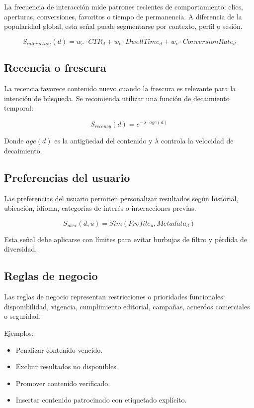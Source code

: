 \documentclass[12pt,a4paper]{article}
\begin{document}
La frecuencia de interacción mide patrones recientes de comportamiento: clics, aperturas, conversiones, favoritos o tiempo de permanencia. A diferencia de la popularidad global, esta señal puede segmentarse por contexto, perfil o sesión.

\[
S_{interaction}(d) = w_c \cdot CTR_d + w_t \cdot DwellTime_d + w_v \cdot ConversionRate_d
\]

\subsection{Recencia o frescura}

La recencia favorece contenido nuevo cuando la frescura es relevante para la intención de búsqueda. Se recomienda utilizar una función de decaimiento temporal:

\[
S_{recency}(d) = e^{-\lambda \cdot age(d)}
\]

Donde $age(d)$ es la antigüedad del contenido y $\lambda$ controla la velocidad de decaimiento.

\subsection{Preferencias del usuario}

Las preferencias del usuario permiten personalizar resultados según historial, ubicación, idioma, categorías de interés o interacciones previas.

\[
S_{user}(d,u) = Sim(Profile_u, Metadata_d)
\]

Esta señal debe aplicarse con límites para evitar burbujas de filtro y pérdida de diversidad.

\subsection{Reglas de negocio}

Las reglas de negocio representan restricciones o prioridades funcionales: disponibilidad, vigencia, cumplimiento editorial, campañas, acuerdos comerciales o seguridad.

Ejemplos:

\begin{itemize}[noitemsep]
    \item Penalizar contenido vencido.
    \item Excluir resultados no disponibles.
    \item Promover contenido verificado.
    \item Insertar contenido patrocinado con etiquetado explícito.
\end{itemize}
\end{document}
